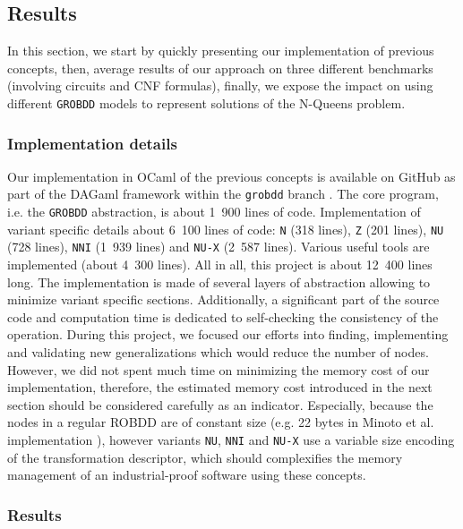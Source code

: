 \documentclass[a4paper,10pt]{article}
\newcommand{\GroBdd}{\texttt{GROBDD}}
\begin{document}
\subsection{Results}
In this section, we start by quickly presenting our implementation of previous concepts, then, average results of our approach on three different benchmarks (involving circuits and CNF formulas), finally, we expose the impact on using different \GroBdd{} models to represent solutions of the N-Queens problem.

\subsubsection{Implementation details}
Our implementation in OCaml of the previous concepts is available on GitHub as part of the DAGaml framework within the \texttt{grobdd} branch \cite{DAGamlGitHub}.
The core program, i.e. the \GroBdd{} abstraction, is about 1~900 lines of code.
Implementation of variant specific details about 6~100 lines of code: \texttt{N} (318 lines), \texttt{Z} (201 lines), \texttt{NU} (728 lines), \texttt{NNI} (1~939 lines) and \texttt{NU-X} (2~587 lines).
Various useful tools are implemented (about 4~300 lines).
All in all, this project is about 12~400 lines long.
The implementation is made of several layers of abstraction allowing to minimize variant specific sections.
Additionally, a significant part of the source code and computation time is dedicated to self-checking the consistency of the operation.
During this project, we focused our efforts into finding, implementing and validating new generalizations which would reduce the number of nodes.
However, we did not spent much time on minimizing the memory cost of our implementation, therefore, the estimated memory cost introduced in the next section should be considered carefully as an indicator.
Especially, because the nodes in a regular ROBDD are of constant size (e.g. 22 bytes in Minoto et al. implementation \cite{MinatoVariants}), however variants \texttt{NU}, \texttt{NNI} and \texttt{NU-X} use a variable size encoding of the transformation descriptor, which should complexifies the memory management of an industrial-proof software using these concepts.

\subsubsection{Results}
\end{document}
